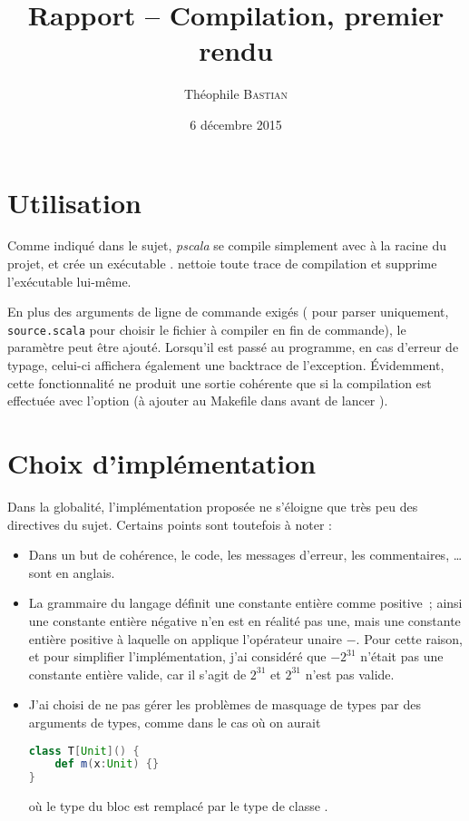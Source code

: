\documentclass[11pt,a4paper]{article}
\author{Théophile \textsc{Bastian}}
\title{Rapport -- Compilation, premier rendu}
\date{6 décembre 2015}
\begin{document}
\maketitle

\section{Utilisation}

Comme indiqué dans le sujet, \emph{pscala} se compile simplement avec  à la racine du projet, et crée un exécutable .  nettoie toute trace de compilation et supprime l'exécutable lui-même.

En plus des arguments de ligne de commande exigés ( pour parser uniquement, \mbox{\lstinline`source.scala`} pour choisir le fichier à compiler en fin de commande), le paramètre  peut être ajouté. Lorsqu'il est passé au programme, en cas d'erreur de typage, celui-ci affichera également une backtrace de l'exception. \'Evidemment, cette fonctionnalité ne produit une sortie cohérente que si la compilation est effectuée avec l'option  (à ajouter au Makefile dans  avant de lancer ).	

\section{Choix d'implémentation}

Dans la globalité, l'implémentation proposée ne s'éloigne que très peu des directives du sujet. Certains points sont toutefois à noter :

\begin{itemize}
\item Dans un but de cohérence, le code, les messages d'erreur, les commentaires, \ldots{} sont en anglais.
\item La grammaire du langage définit une constante entière comme positive~; ainsi une \og constante entière négative \fg{} n'en est en réalité pas une, mais une constante entière positive à laquelle on applique l'opérateur unaire $-$. Pour cette raison, et pour simplifier l'implémentation, j'ai considéré que $-2^{31}$ n'était pas une constante entière valide, car il s'agit de \mbox{$2^{31}$\lstocaml{))}} et $2^{31}$\lstocaml{)} n'est pas valide.

\item J'ai choisi de ne pas gérer les problèmes de masquage de types par des arguments de types, comme dans le cas où on aurait 
\begin{lstlisting}[language=Scala]
class T[Unit]() {
	def m(x:Unit) {}
}
\end{lstlisting}
où le type  du bloc \lstbash{\{\}} est remplacé par le type de classe .
\end{itemize}
\end{document}
